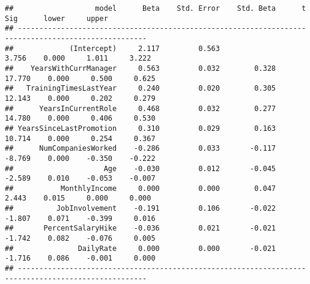 \documentclass[]{article}
\begin{document}
\begin{verbatim}
##                   model      Beta    Std. Error    Std. Beta      t        Sig      lower     upper 
## ----------------------------------------------------------------------------------------------------
##             (Intercept)     2.117         0.563                  3.756    0.000     1.011     3.222 
##    YearsWithCurrManager     0.563         0.032        0.328    17.770    0.000     0.500     0.625 
##   TrainingTimesLastYear     0.240         0.020        0.305    12.143    0.000     0.202     0.279 
##      YearsInCurrentRole     0.468         0.032        0.277    14.780    0.000     0.406     0.530 
## YearsSinceLastPromotion     0.310         0.029        0.163    10.714    0.000     0.254     0.367 
##      NumCompaniesWorked    -0.286         0.033       -0.117    -8.769    0.000    -0.350    -0.222 
##                     Age    -0.030         0.012       -0.045    -2.589    0.010    -0.053    -0.007 
##           MonthlyIncome     0.000         0.000        0.047     2.443    0.015     0.000     0.000 
##          JobInvolvement    -0.191         0.106       -0.022    -1.807    0.071    -0.399     0.016 
##       PercentSalaryHike    -0.036         0.021       -0.021    -1.742    0.082    -0.076     0.005 
##               DailyRate     0.000         0.000       -0.021    -1.716    0.086    -0.001     0.000 
## ----------------------------------------------------------------------------------------------------
\end{verbatim}
\end{document}
